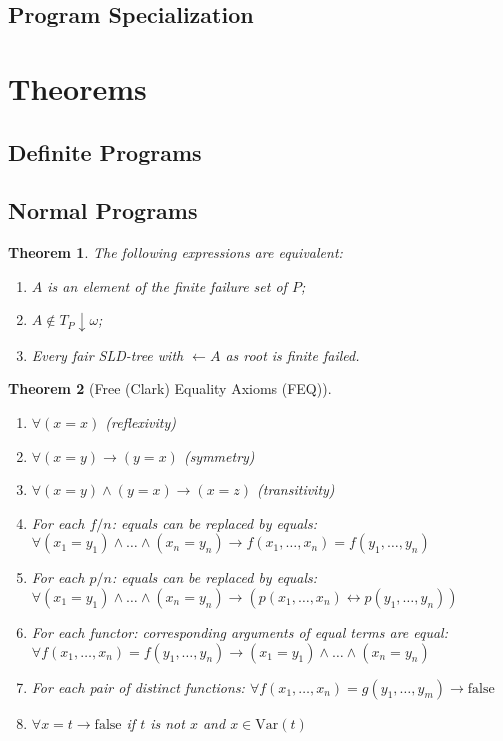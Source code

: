 \documentclass{article}
\newcommand{\brak}[1]{\ensuremath{\left(#1\right)}}
\newcommand{\fun}[2]{\ensuremath{#1\brak{#2}}}
\newcommand{\funm}[2]{\ensuremath{\fun{\mbox{#1}}{#2}}}
\newcommand{\Var}[1]{\funm{Var}{#1}}
\newcommand{\fls}[0]{\mbox{false}}
\theoremstyle{definition}
\theoremstyle{plain}
\newtheorem{theorem}{Theorem}
\begin{document}
\subsection{Program Specialization}
\section{Theorems}
\subsection{Definite Programs}
\subsection{Normal Programs}
\begin{theorem}
The following expressions are equivalent:
\begin{enumerate}
 \item $A$ is an element of the finite failure set of $P$;
 \item $A\notin T_P\downarrow\omega$;
 \item Every fair SLD-tree with $\leftarrow A$ as root is finite failed.
\end{enumerate}
\end{theorem}
\begin{theorem}[Free (Clark) Equality Axioms (FEQ)]
\begin{enumerate}
 \item $\forall\brak{x=x}$ (reflexivity)
 \item $\forall\brak{x=y}\rightarrow\brak{y=x}$ (symmetry)
 \item $\forall\brak{x=y}\wedge\brak{y=x}\rightarrow\brak{x=z}$ (transitivity)
 \item For each $f/n$: equals can be replaced by equals: $\forall\brak{x_1=y_1}\wedge\ldots\wedge\brak{x_n=y_n}\rightarrow\fun{f}{x_1,\ldots,x_n}=\fun{f}{y_1,\ldots,y_n}$
 \item For each $p/n$: equals can be replaced by equals: $\forall\brak{x_1=y_1}\wedge\ldots\wedge\brak{x_n=y_n}\rightarrow\brak{\fun{p}{x_1,\ldots,x_n}\leftrightarrow\fun{p}{y_1,\ldots,y_n}}$
 \item For each functor: corresponding arguments of equal terms are equal: $\forall\fun{f}{x_1,\ldots,x_n}=\fun{f}{y_1,\ldots,y_n}\rightarrow\brak{x_1=y_1}\wedge\ldots\wedge\brak{x_n=y_n}$
 \item For each pair of distinct functions: $\forall\fun{f}{x_1,\ldots,x_n}=\fun{g}{y_1,\ldots,y_m}\rightarrow\fls$
 \item $\forall x=t\rightarrow\fls$ if $t$ is not $x$ and $x\in\Var{t}$
\end{enumerate}
\end{theorem}
\end{document}
